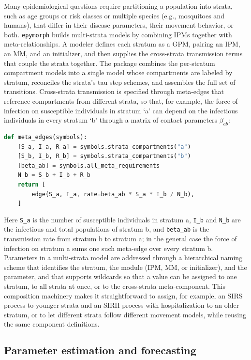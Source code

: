 Many epidemiological questions require partitioning a population into strata, such as age
groups or risk classes or multiple species (e.g., mosquitoes and humans), that differ in
their disease parameters, their movement behavior, or both. \texttt{epymorph} builds
multi-strata models by combining IPMs together with meta-relationships. A modeler defines
each stratum as a GPM, pairing an IPM, an MM, and an initializer, and then supplies the
cross-strata transmission terms that couple the strata together. The package combines the
per-stratum compartment models into a single model whose compartments are labeled by
stratum, reconciles the strata's tau step schemes, and assembles the full set of
transitions. Cross-strata transmission is specified through meta-edges that reference
compartments from different strata, so that, for example, the force of infection on
susceptible individuals in stratum `a' can depend on the infectious individuals in every
stratum `b' through a matrix of contact parameters $\beta_{ab}$:

\begin{lstlisting}[language=Python]
def meta_edges(symbols):
    [S_a, I_a, R_a] = symbols.strata_compartments("a")
    [S_b, I_b, R_b] = symbols.strata_compartments("b")
    [beta_ab] = symbols.all_meta_requirements
    N_b = S_b + I_b + R_b
    return [
        edge(S_a, I_a, rate=beta_ab * S_a * I_b / N_b),
    ]
\end{lstlisting}

Here \texttt{S\_a} is the number of susceptible individuals in stratum a, \texttt{I\_b} and
\texttt{N\_b} are the infectious and total populations of stratum b, and \texttt{beta\_ab}
is the transmission rate from stratum b to stratum a; in the general case the force of
infection on stratum a sums one such meta-edge over every stratum b. Parameters in a
multi-strata model are addressed through a hierarchical naming scheme that identifies the
stratum, the module (IPM, MM, or initializer), and the parameter, and that supports
wildcards so that a value can be assigned to one stratum, to all strata at once, or to the
cross-strata meta-component. This composition machinery makes it straightforward to assign,
for example, an SIRS process to younger strata and an SIRH process with hospitalization to
an older stratum, or to let different strata follow different movement models, while reusing
the same component definitions.

\subsection{Parameter estimation and forecasting}


